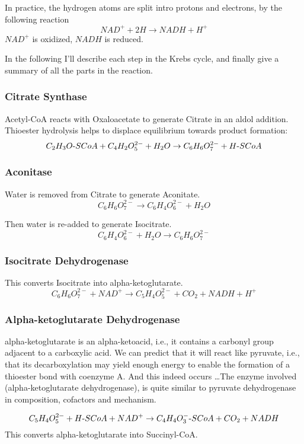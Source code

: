 \documentclass{article}
\def\mhyphen{{\hbox{-}}}
\begin{document}
In practice, the hydrogen atoms are split intro protons and electrons, by the following
reaction
\[
    NAD^+ + 2H \rightarrow NADH + H^+
\]
$NAD^+$ is oxidized, $NADH$ is reduced.

In the following I'll describe each step in the Krebs cycle, and finally give a summary of
all the parts in the reaction.

\subsubsection{Citrate Synthase}
Acetyl-CoA reacts with Oxaloacetate to generate Citrate in an aldol addition.
Thioester hydrolysis helps to displace equilibrium towards product formation:
\[
    C_2H_3O{\mhyphen}SCoA + C_4H_2O_5^{2-} + H_2O \rightarrow
    C_6H_6O_7^{2-} + H{\mhyphen}SCoA
\]

\subsubsection{Aconitase}
Water is removed from Citrate to generate Aconitate.
\[
    C_6H_6O_7^{2-} \rightarrow C_6H_4O_6^{2-} + H_2O
\]

Then water is re-added to generate Isocitrate.
\[
    C_6H_4O_6^{2-} + H_2O \rightarrow C_6H_6O_7^{2-}
\]

\subsubsection{Isocitrate Dehydrogenase}
This converts Isocitrate into alpha-ketoglutarate.
\[
    C_6H_6O_7^{2-} + NAD^+ \rightarrow C_5H_4O_5^{2-} + CO_2 + NADH + H^+
\]

\subsubsection{Alpha-ketoglutarate Dehydrogenase}
alpha-ketoglutarate is an alpha-ketoacid, i.e., it contains a carbonyl group adjacent to a
carboxylic acid. We can predict that it will react like pyruvate, i.e., that its
decarboxylation may yield enough energy to enable the formation of a thioester bond with
coenzyme A. And this indeed occurs \ldots The enzyme involved (alpha-ketoglutarate dehydrogenase),
is quite similar to pyruvate dehydrogenase in composition, cofactors and mechanism.

\[
    C_5H_4O_5^{2-} + H{\mhyphen}SCoA + NAD^+ \rightarrow
    C_4H_4O_3^{-}{\mhyphen}SCoA + CO_2 + NADH
\]
This converts alpha-ketoglutarate into Succinyl-CoA.
\end{document}
